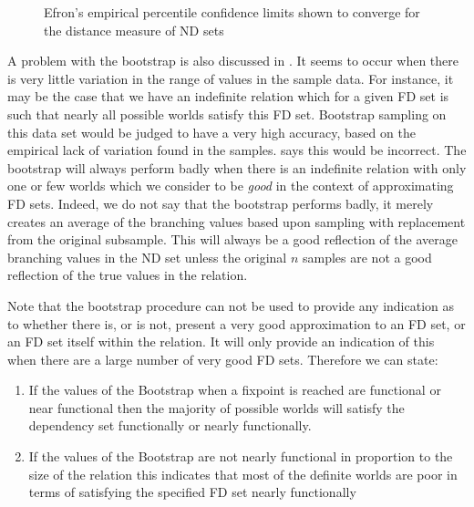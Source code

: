 \begin{figure}
\centerline{}
\caption{\label{graph:conlim} {Efron's empirical percentile
 confidence limits shown to converge for the distance measure of ND sets}}
\end{figure}


A problem with the bootstrap is also discussed in \cite{de83}. It
seems to occur when there is very little variation in the range
of values in the sample data. For instance, it may be the case that
we have an indefinite relation which for a given FD set is such that
nearly all possible worlds satisfy this FD set. Bootstrap sampling
on this data set would be judged to have a very high accuracy,
based on the empirical lack of variation found in the samples.
\cite{de83} says this would be incorrect. The bootstrap will always
perform badly when there is an indefinite relation
with only one or few worlds which we consider to be {\em good} in
the context of approximating FD sets.
Indeed, we do not say that the bootstrap performs badly, it merely
creates an average of the branching values based upon sampling with
replacement from the original subsample. This will always be a good
reflection of the average branching values in the ND set unless the
original $n$ samples are not a good reflection of the true values
in the relation.

Note that the bootstrap procedure can not be used to provide any
indication as to whether there is, or is not, present a very good
approximation to an FD set, or an FD set itself within the relation.
It will only provide an indication of this when there are a large 
number of very good FD sets. Therefore we can state:
\begin{enumerate}
\item If the values of the Bootstrap when a fixpoint is reached
are functional or near functional then the majority of possible
worlds will satisfy the dependency set functionally or nearly functionally.
\item If the values of the Bootstrap are not
nearly functional in proportion to the size of the relation this
indicates that most of the definite worlds are poor in terms of
satisfying the specified FD set nearly functionally
\end{enumerate} 

